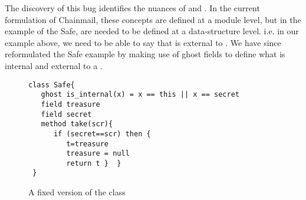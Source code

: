 The discovery of this bug identifies the nuances of  and . In the current formulation of 
Chainmail, these concepts are defined at a module level, but in the example of the Safe, are needed to be defined 
at a data-structure level. i.e. in our example above, we need to be able to say that  is external to .
We have since reformulated the Safe example by making use of ghost fields to define what is internal and external 
to a .

 \begin{figure}[htb]
\begin{lstlisting}
class Safe{
   ghost is_internal(x) = x == this || x == secret
   field treasure 
   field secret 
   method take(scr){
      if (secret==scr) then {
         t=treasure
         treasure = null
         return t }  }
 }
\end{lstlisting}
  \vspace*{-0.95cm}
  \caption{A fixed version of the class }
 \label{fig:ExampleSafeFix}
 \vspace*{-0.65cm}
 \end{figure}